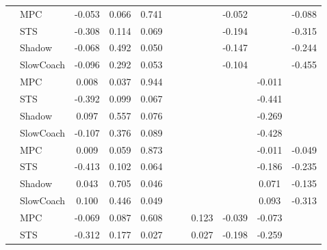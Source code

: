 \begin{tabular}{|l|l|*{9}{c|}}
\midrule
[True, True, True, False, False, False, True, False, True] & MPC &   -0.053 &     0.066 &     0.741 &     &     &     &  -0.052 &      &   -0.088 \\
                                                           & STS &   -0.308 &     0.114 &     0.069 &     &     &     &  -0.194 &      &   -0.315 \\
                                                           & Shadow &   -0.068 &     0.492 &     0.050 &     &     &     &  -0.147 &      &   -0.244 \\
                                                           & SlowCoach &   -0.096 &     0.292 &     0.053 &     &     &     &  -0.104 &      &   -0.455 \\
\midrule
[True, True, True, False, False, False, False, True, False] & MPC &    0.008 &     0.037 &     0.944 &     &     &     &      &  -0.011 &       \\
                                                           & STS &   -0.392 &     0.099 &     0.067 &     &     &     &      &  -0.441 &       \\
                                                           & Shadow &    0.097 &     0.557 &     0.076 &     &     &     &      &  -0.269 &       \\
                                                           & SlowCoach &   -0.107 &     0.376 &     0.089 &     &     &     &      &  -0.428 &       \\
\midrule
[True, True, True, False, False, False, False, True, True] & MPC &    0.009 &     0.059 &     0.873 &     &     &     &      &  -0.011 &   -0.049 \\
                                                           & STS &   -0.413 &     0.102 &     0.064 &     &     &     &      &  -0.186 &   -0.235 \\
                                                           & Shadow &    0.043 &     0.705 &     0.046 &     &     &     &      &   0.071 &   -0.135 \\
                                                           & SlowCoach &    0.100 &     0.446 &     0.049 &     &     &     &      &   0.093 &   -0.313 \\
\midrule
[True, True, True, False, False, True, True, True, False] & MPC &   -0.069 &     0.087 &     0.608 &     &     &  0.123 &  -0.039 &  -0.073 &       \\
                                                           & STS &   -0.312 &     0.177 &     0.027 &     &     &  0.027 &  -0.198 &  -0.259 &       \\

\end{tabular}
